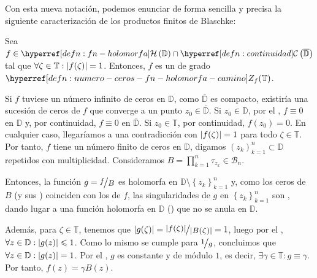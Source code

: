Con esta nueva notación, podemos enunciar de forma sencilla y precisa la siguiente caracterización de los productos finitos de Blaschke:

\begin{teo}\label{teo:carac-prod-finito-blaschke}
    Sea $f \in \exhyperref[defn:fn-holomorfa]{fn-holomorfa}{\mathcal{H}} \left(\mathbb{D}\right) \cap \exhyperref[defn:continuidad]{continuidad}{\mathcal{C}} \left(\bar{\mathbb{D}}\right)$ tal que $\forall \zeta \in \mathbb{T} : \left|f(\zeta)\right| = 1$. Entonces, $f$ es un  de grado $\exhyperref[defn:numero-ceros-fn-holomorfa-camino]{numero-ceros-fn-holomorfa-camino}{Z_f}(\mathbb{T})$.
\end{teo}
\begin{dem}
    Si $f$ tuviese un número infinito de ceros en $\mathbb{D}$, como $\bar{\mathbb{D}}$ es compacto, existiría una sucesión de ceros de $f$ que converge a un punto $z_0 \in \bar{\mathbb{D}}$. Si $z_0 \in \mathbb{D}$, por el , $f \equiv 0$ en $\mathbb{D}$ y, por continuidad, $f \equiv 0$ en $\bar{\mathbb{D}}$. Si $z_0 \in \mathbb{T}$, por continuidad, $f(z_0)=0$. En cualquier caso, llegaríamos a una contradicción con $\left|f(\zeta)\right| = 1$ para todo $\zeta \in \mathbb{T}$. Por tanto, $f$ tiene un número finito de ceros en $\mathbb{D}$, digamos $\left(z_k\right)_{k=1}^n \subset \mathbb{D}$ repetidos con multiplicidad. Consideramos $B = \prod_{k=1}^n \tau_{z_k} \in \mathscr{B}_n$.

    Entonces, la función $g = \sfrac{f}{B}$ es holomorfa en $\mathbb{D} \setminus \left\{z_k\right\}_{k=1}^n$ y, como los ceros de $B$ (y sus ) coinciden con los de $f$, las singularidades de $g$ en $\left\{z_k\right\}_{k=1}^n$ son , dando lugar a una función holomorfa en $\mathbb{D}$ () que no se anula en $\mathbb{D}$.

    Además, para $\zeta \in \mathbb{T}$, tenemos que $\abs{g(\zeta)} = \sfrac{\abs{f(\zeta)}}{\abs{B(\zeta)}} = 1$, luego por el , $\forall z \in \mathbb{D} : \left|g(z)\right| \leqslant 1$. Como lo mismo se cumple para $\sfrac{1}{g}$, concluimos que $\forall z \in \mathbb{D} : \left|g(z)\right| = 1$. Por el , $g$ es constante y de módulo $1$, es decir, $\exists \gamma \in \mathbb{T} : g \equiv \gamma$. Por tanto, $f(z) = \gamma B(z)$.\hfill\qedsymbol
\end{dem}

